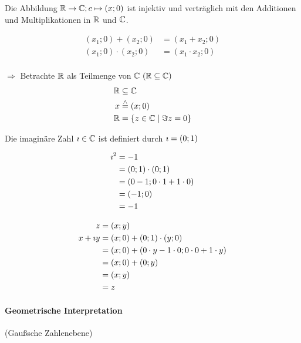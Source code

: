 Die Abbildung $\mathbb{R}\to\mathbb{C};c\mapsto(x;0)$ ist injektiv und verträglich mit den Additionen und Multiplikationen in $\mathbb{R}$ und $\mathbb{C}$.

\begin{align*}
(x_1;0)+(x_2;0) &= (x_1+x_2;0)\\
(x_1;0)\cdot(x_2;0) &= (x_1\cdot x_2;0)\\
\end{align*}

$\Rightarrow$ Betrachte $\mathbb{R}$ als Teilmenge von $\mathbb{C}\ (\mathbb{R}\subseteq\mathbb{C})$
\begin{align*}
\mathbb{R} &\subseteq \mathbb{C}\\
x &\stackrel{\wedge}{=} (x;0)\\
\mathbb{R} &= \{z\in\mathbb{C}\mid\Im{z}=0\}
\end{align*}

\Def Die imaginäre Zahl $\imath\in\mathbb{C}$ ist definiert durch $\imath=(0;1)$

\Beh 
\begin{align*}
\imath^2 &= -1\\
&=(0;1)\cdot(0;1)\\
&= (0-1;0\cdot 1 + 1\cdot 0)\\
&= (-1;0)\\
&= -1
\end{align*}


\Beweis 
\begin{align*}
z&=(x;y)\\
x+\imath y &= (x;0)+(0;1)\cdot(y;0)\\
&= (x;0) + (0\cdot y-1\cdot 0; 0\cdot 0+1\cdot y)\\
&= (x;0) + (0; y)\\
&= (x;y)\\
&= z
\end{align*}

\paragraph{Geometrische Interpretation} (Gaußsche Zahlenebene)

